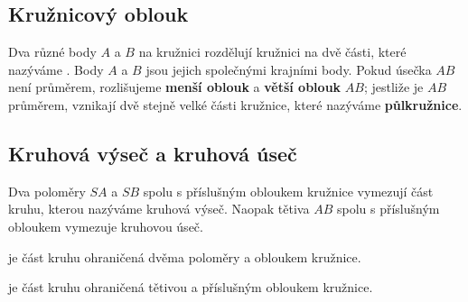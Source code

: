 \documentclass[12pt,a4paper]{article}
\begin{document}
\subsection{Kružnicový oblouk}

Dva různé body $A$ a $B$ na kružnici rozdělují kružnici na dvě části, které nazýváme .
Body $A$ a $B$ jsou jejich společnými krajními body. Pokud úsečka $AB$ není průměrem, rozlišujeme \textbf{menší oblouk}
a \textbf{větší oblouk} $AB$; jestliže je $AB$ průměrem, vznikají dvě stejně velké části kružnice, které nazýváme
\textbf{půlkružnice}.

\subsection{Kruhová výseč a kruhová úseč}

Dva poloměry $SA$ a $SB$ spolu s příslušným obloukem kružnice vymezují část kruhu, kterou nazýváme kruhová výseč.
Naopak tětiva $AB$ spolu s příslušným obloukem vymezuje kruhovou úseč.

\begin{definitionbox}
     je část kruhu ohraničená dvěma poloměry a obloukem kružnice.

    \medskip

     je část kruhu ohraničená tětivou a příslušným obloukem kružnice.
\end{definitionbox}

\begin{center}
\end{center}
\end{document}
